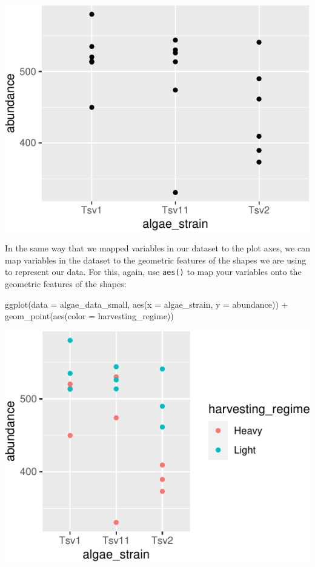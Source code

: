 \documentclass[
]{krantz}
\newenvironment{Shaded}{\begin{snugshade}}{\end{snugshade}}
\newcommand{\AttributeTok}[1]{\textcolor[rgb]{0.77,0.63,0.00}{#1}}
\newcommand{\FunctionTok}[1]{\textcolor[rgb]{0.00,0.00,0.00}{#1}}
\newcommand{\NormalTok}[1]{#1}
\newcommand{\SpecialCharTok}[1]{\textcolor[rgb]{0.00,0.00,0.00}{#1}}
\begin{document}
\begin{center}\includegraphics[width=0.8\linewidth]{index_files/figure-latex/unnamed-chunk-23-1} \end{center}

In the same way that we mapped variables in our dataset to the plot axes, we can map variables in the dataset to the geometric features of the shapes we are using to represent our data. For this, again, use \texttt{aes()} to map your variables onto the geometric features of the shapes:

\begin{Shaded}
\begin{Highlighting}[]
\FunctionTok{ggplot}\NormalTok{(}\AttributeTok{data =}\NormalTok{ algae\_data\_small, }\FunctionTok{aes}\NormalTok{(}\AttributeTok{x =}\NormalTok{ algae\_strain, }\AttributeTok{y =}\NormalTok{ abundance)) }\SpecialCharTok{+} 
  \FunctionTok{geom\_point}\NormalTok{(}\FunctionTok{aes}\NormalTok{(}\AttributeTok{color =}\NormalTok{ harvesting\_regime))}
\end{Highlighting}
\end{Shaded}

\begin{center}\includegraphics[width=0.8\linewidth]{index_files/figure-latex/unnamed-chunk-24-1} \end{center}
\end{document}
